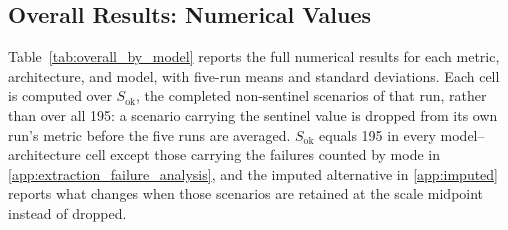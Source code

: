 \documentclass[11pt]{article}
\begin{document}
\subsection{Overall Results: Numerical Values}
\label{app:numerical_results}

Table~\ref{tab:overall_by_model} reports the full numerical results for each metric, architecture, and model, with five-run means and standard deviations. Each cell is computed over $S_{\text{ok}}$, the completed non-sentinel scenarios of that run, rather than over all 195: a scenario carrying the sentinel value is dropped from its own run's metric before the five runs are averaged. $S_{\text{ok}}$ equals 195 in every model--architecture cell except those carrying the failures counted by mode in \ref{app:extraction_failure_analysis}, and the imputed alternative in \ref{app:imputed} reports what changes when those scenarios are retained at the scale midpoint instead of dropped.
\end{document}
